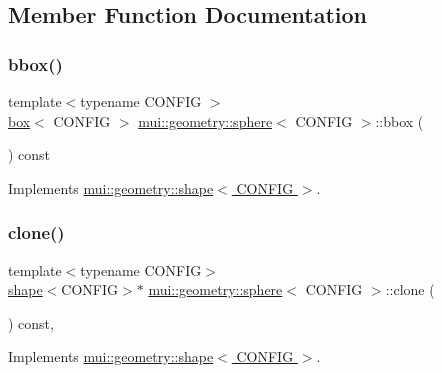 \subsection{Member Function Documentation}
\mbox{\label{classmui_1_1geometry_1_1sphere_a08cbc924590d6c82989eac785dab05d4}} 
\subsubsection{\texorpdfstring{bbox()}{bbox()}}
{\footnotesize\ttfamily template$<$typename C\+O\+N\+F\+IG $>$ \\
\hyperlink{classmui_1_1geometry_1_1box}{box}$<$ C\+O\+N\+F\+IG $>$ \hyperlink{classmui_1_1geometry_1_1sphere}{mui\+::geometry\+::sphere}$<$ C\+O\+N\+F\+IG $>$\+::bbox (\begin{DoxyParamCaption}{ }\end{DoxyParamCaption}) const\hspace{0.3cm}{\ttfamily [virtual]}}



Implements \hyperlink{classmui_1_1geometry_1_1shape_adf598ec651ea425553bd8e617cac7430}{mui\+::geometry\+::shape$<$ C\+O\+N\+F\+I\+G $>$}.

\mbox{\label{classmui_1_1geometry_1_1sphere_a7cb7ff26e352d733ce5194d83c4d4065}} 
\subsubsection{\texorpdfstring{clone()}{clone()}}
{\footnotesize\ttfamily template$<$typename C\+O\+N\+F\+IG$>$ \\
\hyperlink{classmui_1_1geometry_1_1shape}{shape}$<$C\+O\+N\+F\+IG$>$$\ast$ \hyperlink{classmui_1_1geometry_1_1sphere}{mui\+::geometry\+::sphere}$<$ C\+O\+N\+F\+IG $>$\+::clone (\begin{DoxyParamCaption}{ }\end{DoxyParamCaption}) const\hspace{0.3cm}{\ttfamily [inline]}, {\ttfamily [virtual]}}



Implements \hyperlink{classmui_1_1geometry_1_1shape_a4d1307ebc40d462b13da89c811b3beb7}{mui\+::geometry\+::shape$<$ C\+O\+N\+F\+I\+G $>$}.

